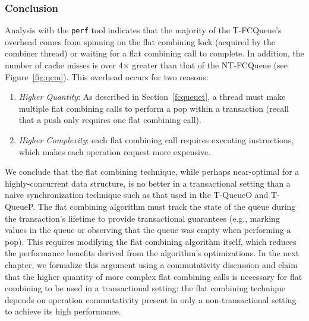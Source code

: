 \subsubsection{Conclusion}
Analysis with the \texttt{perf} tool indicates that the majority of the T-FCQueue's overhead comes from spinning on the flat combining lock (acquired by the combiner thread) or waiting for a flat combining call to complete. In addition, the number of cache misses is over 4$\times$ greater than that of the NT-FCQueue (see Figure~\ref{fig:qcm}). This overhead occurs for two reasons:
\begin{enumerate}
    \item \emph{Higher Quantity}: As described in Section~\ref{fcqueuet}, a thread must make multiple flat combining calls to perform a pop within a transaction (recall that a push only requires one flat combining call).
\item \emph{Higher Complexity}: each flat combining call requires executing instructions, which makes each operation request more expensive.
\end{enumerate}

We conclude that the flat combining technique, while perhaps near-optimal for a highly-concurrent data structure, is no better in a transactional setting than a naive synchronization technique such as that used in the T-QueueO and T-QueueP. The flat combining algorithm must track the state of the queue during the transaction's lifetime to provide transactional guarantees (e.g., marking values in the queue or observing that the queue was empty when performing a pop). This requires modifying the flat combining algorithm itself, which reduces the performance benefits derived from the algorithm's optimizations. In the next chapter, we formalize this argument using a commutativity discussion and claim that the higher quantity of more complex flat combining calls is necessary for flat combining to be used in a transactional setting: the flat combining technique depends on operation commutativity present in only a non-transactional setting to achieve its high performance. 

\iffalse
For ease of reference, we list here the names of queues discussed in this section. Their meaning is explained in context with more detail within the discussion.
\begin{itemize}
    \item T-QueueO: the optimistic, transactional, and naively-concurrent queue.
    \item T-QueueP: the transactional and naively-concurrent queue that performs pessimistic locking upon performing a pop.
    \item NT-FCQueue: the non-transactional flat combining queue.
    \item NT-FCQueueWrapped: a version of NT-FCQueue that invokes STO \texttt{start\_transaction} and \texttt{commit\_transaction} calls.
    \item T-FCQueue: the fully-transactional flat-combining queue.
\end{itemize}

\fi
